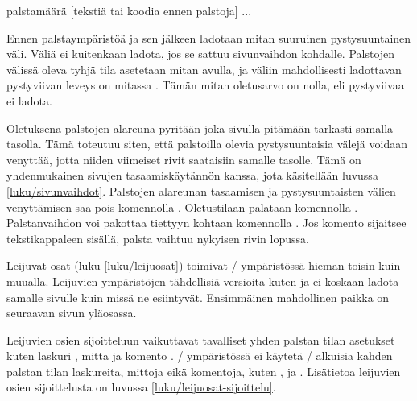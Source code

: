 \begin{koodilohkosis}
\begin{multicols}{palstamäärä}
  [tekstiä tai koodia ennen palstoja]
  ...
\end{multicols}
\end{koodilohkosis}

\noindent
Ennen palstaympäristöä ja sen jälkeen ladotaan mitan 
suuruinen pystysuuntainen väli. Väliä ei kuitenkaan ladota, jos se
sattuu sivunvaihdon kohdalle. Palstojen välissä oleva tyhjä tila
asetetaan mitan  avulla, ja väliin mahdollisesti
ladottavan pystyviivan leveys on mitassa . Tämän
mitan oletusarvo on nolla, eli pystyviivaa ei ladota.

\begin{koodilohkosis}
\setlength{\multicolsep}{.5ex plus .2ex}  %
\setlength{\columnsep}{6mm}               %
\setlength{\columnseprule}{.2mm}          %
\end{koodilohkosis}

\noindent
Oletuksena palstojen alareuna pyritään joka sivulla pitämään tarkasti
samalla tasolla. Tämä toteutuu siten, että palstoilla olevia
pystysuuntaisia välejä voidaan venyttää, jotta niiden viimeiset rivit
saataisiin samalle tasolle. Tämä on yhdenmukainen sivujen
tasaamiskäytännön kanssa, jota käsitellään luvussa
\ref{luku/sivunvaihdot}. Palstojen alareunan tasaamisen ja
pystysuuntaisten välien venyttämisen saa pois komennolla
. Oletustilaan palataan komennolla
. Palstanvaihdon voi pakottaa tiettyyn kohtaan
komennolla . Jos komento sijaitsee tekstikappaleen
sisällä, palsta vaihtuu nykyisen rivin lopussa.

Leijuvat osat (luku \ref{luku/leijuosat}) toimivat
\-/ ympäristössä hieman toisin kuin muualla.
Leijuvien ympäristöjen tähdellisiä versioita kuten  ja
 ei koskaan ladota samalle sivulle kuin missä ne
esiintyvät. Ensimmäinen mahdollinen paikka on seuraavan sivun yläosassa.

Leijuvien osien sijoitteluun vaikuttavat tavalliset yhden palstan tilan
asetukset kuten laskuri , mitta  ja
komento . \-/ ympäristössä ei
käytetä \-/ alkuisia kahden palstan tilan laskureita, mittoja
eikä komentoja, kuten ,  ja
. Lisätietoa leijuvien osien sijoittelusta on
luvussa \ref{luku/leijuosat-sijoittelu}.

